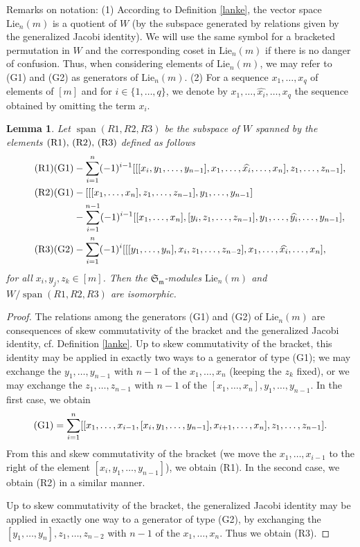 \documentclass[11pt]{amsart}
\newtheorem{lem}[thm]{Lemma}
\theoremstyle{definition}
\numberwithin{equation}{section}
\DeclareMathOperator{\spn}{span}
\begin{document}
Remarks on notation: (1) According to Definition \ref{lanke}, the vector space $\text{Lie}_n(m)$ is a quotient of $W$ (by the subspace generated by relations given by the generalized Jacobi identity). We will use the same symbol for a bracketed permutation in $W$ and the corresponding coset in $\text{Lie}_n(m)$ if there is no danger of confusion. Thus, when considering elements of $\text{Lie}_n(m)$, we may refer to (G1) and (G2) as generators of $\text{Lie}_n(m)$. (2) For a sequence $x_1, \dots, x_q$ of elements of $[m]$ and for $i \in \{1,\dots, q\}$, we denote by $x_1, \dots, \widehat{x_i}, \dots, x_q$ the sequence obtained by omitting the term $x_i$.

\begin{lem}\label{genrel1}
	Let $\spn (R1,R2,R3)$ be the subspace of $W$ spanned by the elements $\textup{(R1), (R2), (R3)}$  defined as follows   \begin{align}\tag{R1} \textup{(G1)}&- \sum_{i=1}^{n}(-1)^{i-1}[[[x_i,{y_{1}},\dots, y_{n-1}],{x_1},\dots ,\widehat{x_i}, \dots, x_n ],z_{1},\dots ,z_{n-1}],\\
		\tag{R2} \textup{(G1)}&- [[[{x_1},\dots ,{x_n} ],{z_{1}},\dots, z_{n-1}], y_{1},\dots ,y_{n-1}]
		\\\nonumber&-\sum_{i=1}^{n-1}(-1)^{i-1}[[{x_1},\dots ,{x_{n}}],[y_{i},z_1, \dots, z_{n-1} ],{y_{1}},\dots, \widehat{y_i},\dots ,y_{n-1}],\\\tag{R3} \textup{(G2)}&-\sum_{i=1}^{n}(-1)^{i}[[[y_1,\dots,y_n],x_i , z_1,\dots, z_{n-2}],x_1,\dots,\widehat{x_i},\dots, x_n],
	\end{align}
for all $x_i, y_j, z_k \in [m]$. Then the $\mathfrak{S_m}$-modules  $\text{Lie}_n(m)$ and $W/\spn (R1,R2,R3)$ are isomorphic. 
\end{lem}
\begin{proof} The relations among the generators (G1) and (G2) of $\text{Lie}_n(m)$ are consequences of skew commutativity of the bracket and the generalized Jacobi identity, cf. Definition \ref{lanke}. Up to skew commutativity of the bracket, this identity may be applied in exactly two ways to a generator of type (G1); we may exchange the $y_1, \dots, y_{n-1}$ with $n-1$ of the $x_1, \dots, x_n$ (keeping the $z_k$ fixed), or we may exchange the $z_1, \dots, z_{n-1}$ with $n-1$ of the $[x_1, \dots, x_n], y_1, \dots, y_{n-1}$. In the first case, we obtain \[ \textup{(G1)} = \sum_{i=1}^{n}[[{x_1},\dots ,{x_{i-1}}, [x_i,{y_{1}},\dots, y_{n-1}], x_{i+1}, \dots, x_n ],z_{1},\dots ,z_{n-1}]. \] From this and skew commutativity of the bracket (we move the ${x_1},\dots ,{x_{i-1}}$ to the right of the element $[x_i,{y_{1}},\dots, y_{n-1}]$), we obtain \textup{(R1)}. In the second case, we obtain \textup{(R2)} in a similar manner.
	
	Up to skew commutativity of the bracket, the generalized Jacobi identity may be applied in exactly one way to a generator of type (G2), by exchanging the $[y_1, \dots, y_n], z_1, \dots, z_{n-2}$ with $n-1$ of the $x_1, \dots, x_n$. Thus we obtain (R3).
\end{proof}
\end{document}
